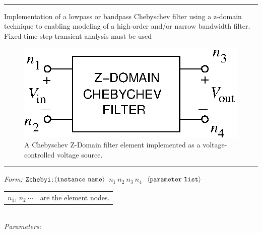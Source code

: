 \documentclass{article}
\begin{document}
\\
\normalsize
\newline
\rule{\textwidth}{0.5mm}

\noindent
Implementation of a lowpass or bandpass Chebyschev filter using a z-domain technique to enabling modeling of a high-order and/or narrow bandwidth filter.  Fixed time-step transient analysis must be used

\begin{figure}[H]
\centerline{\includegraphics{figures/zchebyi.eps}}
\caption{A Chebyschev  Z-Domain filter element implemented as a voltage-controlled voltage source.}
\end{figure}

\noindent
\rule{\textwidth}{0.5mm}
\newline
\textit{Form:}
\newline
$\tt Zchebyi$:$\langle \tt{instance\ name}\rangle$ $n_1\ n_2\ n_3\ n_4\ $
$\langle \tt{parameter\ list}\rangle$
\newline
\begin{tabular}{r l}
$n_1$, $n_2\ \cdots$ & are the element nodes. \\
\end{tabular}\\[0.05in]

\noindent
\textit{Parameters:}\\[0.05in]
\end{document}
